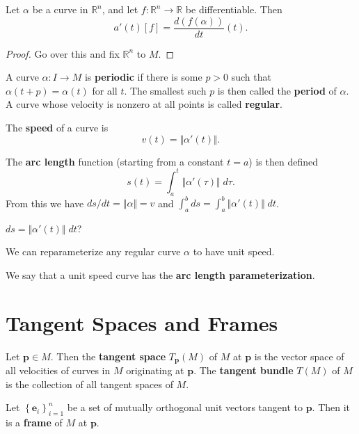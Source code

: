 \documentclass[10pt]{report}
\begin{document}
\begin{prop}
Let $\alpha$ be a curve in $\mathbb{R}^n$, and let $f:\mathbb{R}^n\to \mathbb{R}$ be differentiable. Then
\[
	a'(t)[f] = \frac{d (f(\alpha))}{d t} (t).
\] 
\end{prop}
\begin{proof}
	{\color{red}Go over this and fix $\mathbb{R}^n$ to $M$.}
\end{proof}

A curve $\alpha:I\to M$ is \textbf{periodic} if there is some $p>0$ such that $\alpha(t+p) = \alpha(t)$ for all $t$. The smallest such $p$ is then called the \textbf{period} of $\alpha$. A curve whose velocity is nonzero at all points is called \textbf{regular}.

The \textbf{speed} of a curve is
\[
	v(t) = \Vert{\alpha'(t)}\Vert.
\] 

The \textbf{arc length} function (starting from a constant $t=a$) is then defined
\[
	s(t) = \int_{a}^{t} \Vert{\alpha'(\tau)}\Vert\;d\tau.
\] 
From this we have $ds/dt = \Vert{\alpha}\Vert=v$ and $\int_{a}^{b} ds = \int_{a}^{b} \Vert{\alpha'(t)}\Vert\;dt$.

{\color{red}$ds = \Vert{\alpha'(t)}\Vert\;dt$?}

\begin{thrm}[]
We can reparameterize any regular curve $\alpha$ to have unit speed.
\end{thrm}

We say that a unit speed curve has the \textbf{arc length parameterization}.



\section{Tangent Spaces and Frames}

\begin{defn}
	Let $\mathbf{p} \in M$. Then the \textbf{tangent space} $T_\mathbf{p}(M)$ of $M$ at $\mathbf{p}$ is the vector space of all velocities of curves in $M$ originating at $\mathbf{p}$. The \textbf{tangent bundle} $T( M)$ of $M$ is the collection of all tangent spaces of $M$.
\end{defn}

\begin{defn}[]
Let $\left\{ \mathbf{e}_i \right\}_{i=1}^n$ be a set of mutually orthogonal unit vectors tangent to $\mathbf{p}$. Then it is a \textbf{frame} of $M$ at $\mathbf{p}$.
\end{defn}
\end{document}
